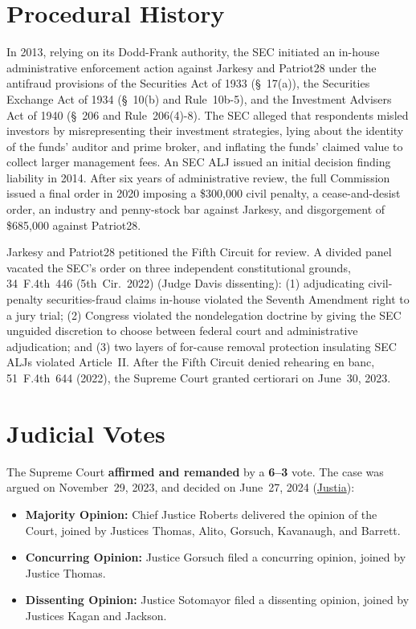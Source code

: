 \documentclass[12pt]{article}
\begin{document}
\section{Procedural History}
In 2013, relying on its Dodd-Frank authority, the SEC initiated an in-house administrative enforcement action against Jarkesy and Patriot28 under the antifraud provisions of the Securities Act of 1933 (\S~17(a)), the Securities Exchange Act of 1934 (\S~10(b) and Rule~10b-5), and the Investment Advisers Act of 1940 (\S~206 and Rule~206(4)-8). The SEC alleged that respondents misled investors by misrepresenting their investment strategies, lying about the identity of the funds' auditor and prime broker, and inflating the funds' claimed value to collect larger management fees. An SEC ALJ issued an initial decision finding liability in 2014. After six years of administrative review, the full Commission issued a final order in 2020 imposing a \$300,000 civil penalty, a cease-and-desist order, an industry and penny-stock bar against Jarkesy, and disgorgement of \$685,000 against Patriot28.

Jarkesy and Patriot28 petitioned the Fifth Circuit for review. A divided panel vacated the SEC's order on three independent constitutional grounds, 34~F.4th~446 (5th~Cir.~2022) (Judge Davis dissenting): (1) adjudicating civil-penalty securities-fraud claims in-house violated the Seventh Amendment right to a jury trial; (2) Congress violated the nondelegation doctrine by giving the SEC unguided discretion to choose between federal court and administrative adjudication; and (3) two layers of for-cause removal protection insulating SEC ALJs violated Article~II. After the Fifth Circuit denied rehearing en banc, 51~F.4th~644 (2022), the Supreme Court granted certiorari on June~30, 2023.

\section{Judicial Votes}
The Supreme Court \textbf{affirmed and remanded} by a \textbf{6--3} vote. The case was argued on November~29, 2023, and decided on June~27, 2024 (\href{https://supreme.justia.com/cases/federal/us/603/22-859/}{Justia}):

\begin{itemize}
    \item \textbf{Majority Opinion:} Chief Justice Roberts delivered the opinion of the Court, joined by Justices Thomas, Alito, Gorsuch, Kavanaugh, and Barrett.
    \item \textbf{Concurring Opinion:} Justice Gorsuch filed a concurring opinion, joined by Justice Thomas.
    \item \textbf{Dissenting Opinion:} Justice Sotomayor filed a dissenting opinion, joined by Justices Kagan and Jackson.
\end{itemize}
\end{document}
